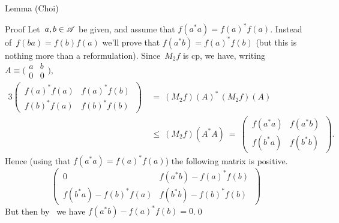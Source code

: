\documentclass[a]{subfiles}
\begin{document}
\begin{parsec}
\begin{point}[choi]{Lemma (Choi)}
\begin{point}{Proof}
Let~$a,b\in \mathscr{A}$ be given,
and assume that $f(a^*a)=f(a)^*f(a)$.
Instead of~$f(ba)=f(b)f(a)$
we'll prove that $f(a^*b)=f(a)^*f(b)$
(but this is nothing more than  a reformulation).
Since~$M_2f$ is cp,
we have, writing 
$A\equiv\bigl(\begin{smallmatrix}a&b\\0&0\end{smallmatrix}\bigr)$,
\begin{alignat*}{3}
\left(\,\begin{matrix}f(a)^*f(a)&f(a)^*f(b)\\
f(b)^*f(a)&f(b)^*f(b)\end{matrix}\,\right) 
	\ &=\ (M_2f)(A)^*\,(M_2f)(A)\\
\ &\leq\ (M_2f)(A^*A) \ =\ 
\left(\,\begin{matrix}f(a^*a)&f(a^*b)\\
f(b^*a)&f(b^*b)\end{matrix}\,\right).
\end{alignat*}
Hence
(using that $f(a^*a)=f(a)^*f(a)$)
the following matrix is positive.
\begin{equation*}
\left(\,\begin{matrix}
0 & f(a^*b) - f(a)^*f(b) \\
f(b^*a)-f(b)^*f(a) & f(b^*b)-f(b)^*f(b)
\end{matrix}\,\right)
\end{equation*}
But then
by~
we have
$f(a^*b)-f(a)^*f(b)=0$.\qed
\end{point}
\end{point}
\end{parsec}
\end{document}
